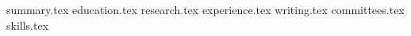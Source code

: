 \documentclass[11pt, a4paper]{awesome-cv}
\newcommand*{\sectiondir}{resume/}
\begin{document}
\makecvheader

{summary.tex}
{education.tex}
{research.tex}
{experience.tex}
{writing.tex}
{committees.tex}
{skills.tex}
\end{document}
